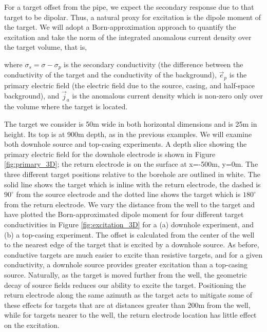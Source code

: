 For a target offset from the pipe, we expect the secondary response due to that target to be dipolar. Thus, a natural proxy for excitation is the dipole moment of the target. We will adopt a Born-approximation approach to quantify the excitation and take the norm of the integrated anomalous current density over the target volume, that is,

where $\sigma_s = \sigma - \sigma_p$ is the secondary conductivity (the difference between the conductivity of the target and the conductivity of the background), $\vec{e}_p$ is the primary electric field (the electric field due to the source, casing, and half-space background), and $\vec{j}_a$ is the anomalous current density which is non-zero only over the volume where the target is located.

The target we consider is 50m wide in both horizontal dimensions and is 25m in height. Its top is at 900m depth, as in the previous examples. We will examine both downhole source and top-casing experiments. A depth slice showing the primary electric field for the downhole electrode is shown in Figure \ref{fig:primary_3D}; the return electrode is on the surface at x=-500m, y=0m. The three different target positions relative to the borehole are outlined in white. The solid line shows the target which is inline with the return electrode, the dashed is $90^\circ$ from the source electrode and the dotted line shows the target which is $180^\circ$ from the return electrode. We vary the distance from the well to the target and have plotted the Born-approximated dipole moment for four different target conductivities in Figure \ref{fig:excitation_3D} for a (a) downhole experiment, and (b) a top-casing experiment. The offset is calculated from the center of the well to the nearest edge of the target that is excited by a downhole source. As before, conductive targets are much easier to excite than resistive targets, and for a given conductivity, a downhole source provides greater excitation than a top-casing source. Naturally, as the target is moved further from the well, the geometric decay of source fields reduces our ability to excite the target. Positioning the return electrode along the same azimuth as the target acts to mitigate some of these effects for targets that are at distances greater than 200m from the well, while for targets nearer to the well, the return electrode location has little effect on the excitation.







